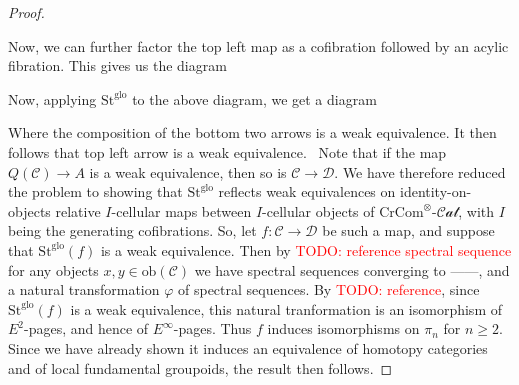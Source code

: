 \documentclass[12pt]{article}
\theoremstyle{definition}
\newcommand{\TODO}[1]{\textcolor{red}{TODO: {#1}}}
\renewcommand{\phi}{\varphi}
\newcommand{\C}{\mathcal{C}}
\newcommand{\D}{\mathcal{D}}
\newcommand{\crcom}{\text{CrCom}}
\newcommand{\tensorcrossedcat}{\crcom^\otimes\text{-}\mathcal{Cat}}
\newcommand{\ob}{\text{ob}}
\newcommand{\st}{\text{St}}
\newcommand{\lefttwo}{\st^{\text{glo}}}
\begin{document}
\begin{proof}
\begin{center}
		\end{center}
		Now, we can further factor the top left map as a cofibration followed by an acylic fibration. This gives us the diagram
		\begin{center}
		\end{center}
		Now, applying $\lefttwo$ to the above diagram, we get a diagram
		\begin{center}
		\end{center}
		Where the composition of the bottom two arrows is a weak equivalence. It then follows that top left arrow is a weak equivalence. \
		Note that if the map $Q(\C) \to A$ is a weak equivalence, then so is $\C \to \D$. 
		We have therefore reduced the problem to showing that $\lefttwo$ reflects weak equivalences on identity-on-objects relative $I$-cellular maps between $I$-cellular objects of $\tensorcrossedcat$, with $I$ being the generating cofibrations.
		So, let $f: \C \to \D$ be such a map, and suppose that $\lefttwo(f)$ is a weak equivalence. 
		Then by \TODO{reference spectral sequence} for any objects $x,y \in \ob(\C)$ we have spectral sequences converging to ------, and a natural transformation $\phi$ of spectral sequences. 
		By \TODO{reference}, since $\lefttwo(f)$ is a weak equivalence, this natural tranformation is an isomorphism of $E^2$-pages, and hence of $E^\infty$-pages. 
		Thus $f$ induces isomorphisms on $\pi_n$ for $n \ge 2$. 
		Since we have already shown it induces an equivalence of homotopy categories and of local fundamental groupoids, the result then follows.
	\end{proof}
\end{document}
